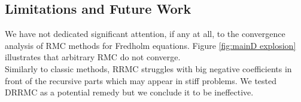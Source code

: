 \documentclass[a4paper,12pt]{article}
\begin{document}
\begin{pythonn} \label{py:nonlinear RRMC IVP}
\end{pythonn}






\subsection{Limitations and Future Work}

We have not dedicated significant attention, if any at all, to
the convergence analysis of RMC methods
for Fredholm equations. Figure \ref{fig:mainD explosion} illustrates
that arbitrary RMC do not converge. \\



Similarly to classic methods, RRMC struggles with big negative coefficients in front
of the recursive parts which may appear in
stiff problems. We tested DRRMC as a potential remedy but we conclude
it to be ineffective.
\end{document}
